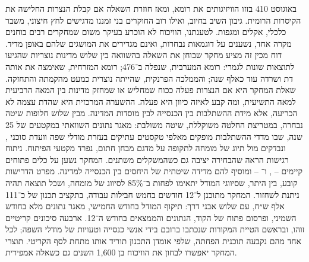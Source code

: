 
\begin{executivesummary}
באוגוסט 410 בזזו הוויזיגותים את רומא, ומאז חוזרת השאלה אם קבלת הנצרות החלישה את הקיסרות הרומית. גיבון השיב בחיוב, ואילו רוב החוקרים בני זמננו מדגישים לחץ חיצוני, משבר כלכלי, אקלים ומגפות. לטענתנו, הוויכוח לא הוכרע בעיקר משום שמחקרים רבים בוחנים מקרה אחד, נשענים על דוגמאות נבחרות, ואינם מגדירים את המושגים שלהם באופן מדיד. דוח מכין זה מציע מחקר שבוחן את השאלה בהשוואה בין שלוש מדינות נוצריות שהגיעו לתוצאות שונות לגמרי: רומא המערבית, שנפלה ב־476; רומא המזרחית, שאימצה את אותה דת ושרדה עוד כאלף שנה; והממלכה הפרנקית, שהייתה נוצרית כמעט מהקמתה והתחזקה. שאלת המחקר היא אם הנצרות פעלה ככוח שמחליש או שמחזק מדינות בין המאה הרביעית למאה התשיעית, ומה קבע לאיזה כיוון היא פעלה. ההשערה המרכזית היא שהדת עצמה לא הכריעה, אלא מידת ההשתלבות בין הכנסייה לבין מוסדות המדינה. מבין שלוש חלופות שיטה נבחרה, במטריצת החלטה משוקללת, שיטה משולבת: מאגר נתונים השוואתי במקטעים של 25 שנה, שבו מדדי ההשתלבות מופקים מאלפי טקסטים עתיקים בעזרת מודלי שפה וועדת סוכני , ונבדקים מול תיוג של מומחה לתקופה על מדגם מבחן חתום, נפרד מקטעי הפיתוח. ניתוח רגישות הראה שהבחירה יציבה גם כשהמשקלים משתנים. המחקר נשען על כלים פתוחים קיימים – ,  ו־ – ומוסיף להם מדידה שיטתית של היחסים בין הכנסייה למדינה. מפרט הדרישות קובע, בין היתר, שסיווגי המודל יתאימו לפחות ב־85\% לסיווג של מומחה, ושכל תוצאה תהיה ניתנת לשחזור. המחקר מתוכנן ל־12 חודשים בחמש חבילות עבודה, בתקציב תכנון של כ־111 אלף ש״ח, עם שלוש אבני דרך: תיקוף המודל בחודש החמישי, מאגר נתונים מלא בחודש השמיני, ופרסום פתוח של הקוד, הנתונים והממצאים בחודש ה־12. ארבעה סיכונים קריטיים זוהו, ובראשם הטיית המקורות שנכתבו ברובם בידי אנשי כנסייה וטעויות של מודלי השפה; לכל אחד מהם נקבעה תוכנית הפחתה, שלפי אומדן התכנון תוריד אותו מתחת לסף הקריטי. תוצרי המחקר יאפשרו לבחון את הוויכוח בן 1,600 השנים גם כשאלה אמפירית.
\end{executivesummary}

